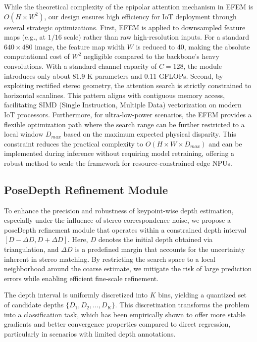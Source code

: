\documentclass[journal]{IEEEtran}
\begin{document}
While the theoretical complexity of the epipolar attention mechanism in EFEM is $O(H \times W^2)$, our design ensures high efficiency for IoT deployment through several strategic optimizations. First, EFEM is applied to downsampled feature maps (e.g., at $1/16$ scale) rather than raw high-resolution inputs. For a standard $640 \times 480$ image, the feature map width $W$ is reduced to 40, making the absolute computational cost of $W^2$ negligible compared to the backbone's heavy convolutions. With a standard channel capacity of $C=128$, the module introduces only about 81.9 K parameters and 0.11 GFLOPs. Second, by exploiting rectified stereo geometry, the attention search is strictly constrained to horizontal scanlines. This pattern aligns with contiguous memory access, facilitating SIMD (Single Instruction, Multiple Data) vectorization on modern IoT processors. Furthermore, for ultra-low-power scenarios, the EFEM provides a flexible optimization path where the search range can be further restricted to a local window $D_{max}$ based on the maximum expected physical disparity. This constraint reduces the practical complexity to $O(H \times W \times D_{max})$ and can be implemented during inference without requiring model retraining, offering a robust method to scale the framework for resource-constrained edge NPUs.

\subsection{PoseDepth Refinement Module}



To enhance the precision and robustness of keypoint-wise depth estimation, especially under the influence of stereo correspondence noise, we propose a poseDepth refinement module that operates within a constrained depth interval $[D - \Delta D, D + \Delta D]$. Here, $D$ denotes the initial depth obtained via triangulation, and $\Delta D$ is a predefined margin that accounts for the uncertainty inherent in stereo matching. By restricting the search space to a local neighborhood around the coarse estimate, we mitigate the risk of large prediction errors while enabling efficient fine-scale refinement.

The depth interval is uniformly discretized into $K$ bins, yielding a quantized set of candidate depths $\{D_1, D_2, \dots, D_K\}$. This discretization transforms the problem into a classification task, which has been empirically shown to offer more stable gradients and better convergence properties compared to direct regression, particularly in scenarios with limited depth annotations.
\end{document}
